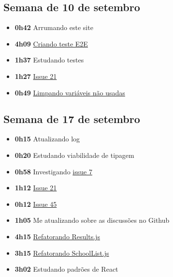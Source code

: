 \hypertarget{semana-de-10-de-setembro}{%
\subsection{Semana de 10 de setembro}\label{semana-de-10-de-setembro}}

\begin{itemize}
\tightlist
\item
  \textbf{0h42} Arrumando este site
\item
  \textbf{4h09}
  \href{https://github.com/prefeiturasp/SME-FilaDaCreche/pull/43}{Criando
  teste E2E}
\item
  \textbf{1h37} Estudando testes
\item
  \textbf{1h27}
  \href{https://github.com/prefeiturasp/SME-FilaDaCreche/pull/44}{Issue
  21}
\item
  \textbf{0h49}
  \href{https://github.com/prefeiturasp/SME-FilaDaCreche/pull/46}{Limpando
  variáveis não usadas}
\end{itemize}

\hypertarget{semana-de-17-de-setembro}{%
\subsection{Semana de 17 de setembro}\label{semana-de-17-de-setembro}}

\begin{itemize}
\tightlist
\item
  \textbf{0h15} Atualizando log
\item
  \textbf{0h20} Estudando viabilidade de tipagem
\item
  \textbf{0h58} Investigando
  \href{https://github.com/prefeiturasp/SME-filadacreche/issues/7}{issue
  7}
\item
  \textbf{1h12}
  \href{https://github.com/prefeiturasp/SME-filadacreche/issues/21}{Issue
  21}
\item
  \textbf{0h12}
  \href{https://github.com/prefeiturasp/SME-filadacreche/issues/45}{Issue
  45}
\item
  \textbf{1h05} Me atualizando sobre as discussões no Github
\item
  \textbf{4h15}
  \href{https://github.com/prefeiturasp/SME-FilaDaCreche/pull/48}{Refatorando
  Results.js}
\item
  \textbf{3h15}
  \href{https://github.com/prefeiturasp/SME-FilaDaCreche/pull/51}{Refatorando
  SchoolList.js}
\item
  \textbf{3h02} Estudando padrões de React
\end{itemize}

